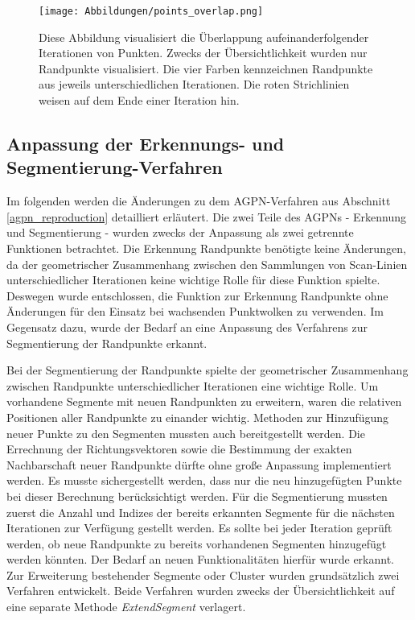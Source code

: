 \begin{figure}[h]
	\texttt{[image: Abbildungen/points\_overlap.png]}
	\centering
	\caption{Diese Abbildung visualisiert die Überlappung aufeinanderfolgender Iterationen von Punkten. Zwecks der Übersichtlichkeit wurden nur Randpunkte visualisiert. Die vier Farben kennzeichnen Randpunkte aus jeweils unterschiedlichen Iterationen. Die roten Strichlinien weisen auf dem Ende einer Iteration hin.}
	\label{fig: point_overlap}
\end{figure}

\subsection{Anpassung der Erkennungs- und Segmentierung-Verfahren}
Im folgenden werden die Änderungen zu dem AGPN-Verfahren aus Abschnitt \ref{agpn_reproduction} detailliert erläutert. Die zwei Teile des AGPNs - Erkennung und Segmentierung - wurden zwecks der Anpassung als zwei getrennte Funktionen betrachtet. Die Erkennung Randpunkte benötigte keine Änderungen, da der geometrischer Zusammenhang zwischen den Sammlungen von Scan-Linien unterschiedlicher Iterationen keine wichtige Rolle für diese Funktion spielte. Deswegen wurde entschlossen, die Funktion zur Erkennung Randpunkte ohne Änderungen für den Einsatz bei wachsenden Punktwolken zu verwenden. Im Gegensatz dazu, wurde der Bedarf an eine Anpassung des Verfahrens zur Segmentierung der Randpunkte erkannt.

Bei der Segmentierung der Randpunkte spielte der geometrischer Zusammenhang zwischen Randpunkte unterschiedlicher Iterationen eine wichtige Rolle. Um vorhandene Segmente mit neuen Randpunkten zu erweitern, waren die relativen Positionen aller Randpunkte zu einander wichtig. Methoden zur Hinzufügung neuer Punkte zu den Segmenten mussten auch bereitgestellt werden. Die Errechnung der Richtungsvektoren sowie die Bestimmung der exakten Nachbarschaft neuer Randpunkte dürfte ohne große Anpassung implementiert werden. Es musste sichergestellt werden, dass nur die neu hinzugefügten Punkte bei dieser Berechnung berücksichtigt werden. Für die Segmentierung mussten zuerst die Anzahl und Indizes der bereits erkannten Segmente für die nächsten Iterationen zur Verfügung gestellt werden. Es sollte bei jeder Iteration geprüft werden, ob neue Randpunkte zu bereits vorhandenen Segmenten hinzugefügt werden könnten. Der Bedarf an neuen Funktionalitäten hierfür wurde erkannt. Zur Erweiterung bestehender Segmente oder Cluster wurden grundsätzlich zwei Verfahren entwickelt. Beide Verfahren wurden zwecks der Übersichtlichkeit auf eine separate Methode \textit{ExtendSegment} verlagert.

